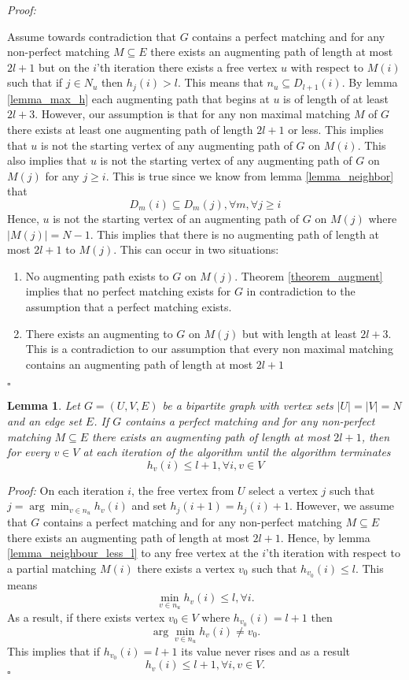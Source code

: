 \documentclass[11pt,onecolumn]{article}
\newcounter{theorem}
\newtheorem{lemma}[theorem]{Lemma}
\newcommand{\beq}{\begin{equation}}
\newcommand{\eeq}{\end{equation}}
\newenvironment{proof}{\textit{Proof:}}{\hfill$\square$\\}
\begin{document}
\begin{proof}

Assume towards contradiction that $G$ contains a perfect matching and for any non-perfect matching $M\subseteq E$  there exists an augmenting path of length at most $2l+1$ but on the $i$'th iteration there exists a free vertex $u$ with respect to $M(i)$ such that if $j\in N_u$ then $h_j(i)> l$. This means that $n_u\subseteq D_{l+1}(i)$. By lemma \ref{lemma_max_h} each augmenting path that begins at $u$ is of length of at least $2l+3$. However, our assumption is that for any non maximal matching $M$ of $G$ there exists at least one augmenting path of length $2l+1$ or less. This implies that $u$ is not the starting vertex of any augmenting path of $G$ on $M(i)$. This also implies that $u$ is not the starting vertex of any augmenting path of $G$ on $M(j)$ for any $j\geq i$. This is true since we know from lemma \ref{lemma_neighbor} that
\beq
D_{m}(i)\subseteq D_{m}(j),\forall m,\forall j\geq i
\eeq
 Hence, $u$ is not the starting vertex of an augmenting path of $G$ on $M(j)$ where $|M(j)|=N-1$. This implies that there is no augmenting path of length at most $2l+1$ to $M(j)$. This can occur in two situations:
  \begin {enumerate}
  \item No augmenting path exists to $G$ on $M(j)$. Theorem \ref{theorem_augment} implies that no perfect matching exists for $G$ in contradiction to the assumption that a perfect matching exists.
  \item There exists an augmenting to $G$ on $M(j)$ but with length at least $2l+3$. This is a contradiction to our assumption that every non maximal matching contains an augmenting path of length at most $2l+1$
  \end{enumerate}
\end{proof}
\begin{lemma}
\label{lemma_h_less_2l} Let $G=(U,V,E)$ be a bipartite graph with vertex sets $|U|=|V|=N$ and an edge set $E$. If $G$ contains a perfect matching and for any non-perfect matching $M\subseteq E$ there exists an augmenting path of length at most $2l+1$, then for every $v\in V$ at each iteration of the algorithm until the algorithm terminates
\beq
h_v(i)\leq l+1 ,\forall i,v\in V
\eeq
\end{lemma}
\begin{proof}
On each iteration $i$, the free vertex from $U$ select a vertex $j$ such that $j=\arg\min_{v\in n_u}h_v(i)$ and set $h_j(i+1)=h_j(i)+1$. However, we assume that $G$ contains a perfect matching and for any non-perfect matching $M\subseteq E$ there exists an augmenting path of length at most $2l+1$. Hence, by lemma \ref{lemma_neighbour_less_l} to any free vertex at the $i$'th iteration with respect to a partial matching $M(i)$ there exists a vertex $v_0$ such that $h_{v_0}(i)\leq l$. This means
\beq
\min_{v\in n_u}h_v(i)\leq l,\forall i.
\eeq
As a result, if there exists vertex $v_0\in V$ where $h_{v_0}(i)=l+1$ then
\beq
\arg\min_{v\in n_u}h_v(i)\neq v_0.
\eeq
This implies that if $h_{v_0}(i)=l+1$ its value never rises and as a result
\beq
h_v(i)\leq l+1 ,\forall i,v\in V.
\eeq
\end{proof}
\end{document}
